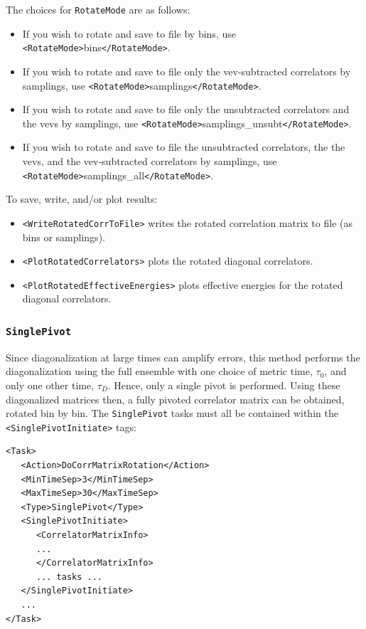 \documentclass[12pt]{article}
\newcommand{\vb}{\texttt}
\begin{document}
The choices for \vb{RotateMode} are as follows:
\begin{itemize}
\item                                                                
If you wish to rotate and save to file by bins, use                           
     \vb{<RotateMode>}bins\vb{</RotateMode>}.                                        
\item
If you wish to rotate and save to file only the vev-subtracted correlators    
by samplings, use                                                             
     \vb{<RotateMode>}samplings\vb{</RotateMode>}.
\item
If you wish to rotate and save to file only the unsubtracted correlators      
and the vevs by samplings, use                                                
     \vb{<RotateMode>}samplings\_unsubt\vb{</RotateMode>}.                                
\item
If you wish to rotate and save to file the unsubtracted correlators, the      
the vevs, and the vev-subtracted correlators by samplings, use                
     \vb{<RotateMode>}samplings\_all\vb{</RotateMode>}.                                   
\end{itemize}

To save, write, and/or plot results:
\begin{itemize}
\item \vb{<WriteRotatedCorrToFile>} writes the rotated correlation matrix to file (as bins or samplings).
\item \vb{<PlotRotatedCorrelators>} plots the rotated diagonal correlators.
\item \vb{<PlotRotatedEffectiveEnergies>} plots effective energies for the rotated diagonal correlators.
\end{itemize}


\subsubsection{\vb{SinglePivot}} 
\label{sec:single_pivot}
Since diagonalization at large times can amplify errors, this method performs the
diagonalization using the full ensemble with one choice of metric time, $\tau_0$,
and only one other time, $\tau_D$. Hence, only a single pivot is performed.
Using these diagonalized matrices then, a fully pivoted correlator matrix can be
obtained, rotated bin by bin. The \vb{SinglePivot} tasks must all be contained
within the \vb{<SinglePivotInitiate>} tags:
\begin{verbatim}
<Task>
   <Action>DoCorrMatrixRotation</Action>
   <MinTimeSep>3</MinTimeSep>
   <MaxTimeSep>30</MaxTimeSep>
   <Type>SinglePivot</Type>
   <SinglePivotInitiate>
      <CorrelatorMatrixInfo>
      ...
      </CorrelatorMatrixInfo>
      ... tasks ...
   </SinglePivotInitiate>
   ...
</Task>
\end{verbatim}
\end{document}
